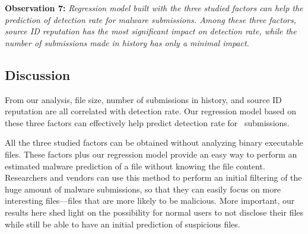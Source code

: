 {\bf Observation 7:} 
{\em Regression model built with the three studied factors can help the prediction of detection rate for malware submissions. 
Among these three factors, source ID reputation has the most significant impact on detection rate, while the number of submissions 
made in history has only a minimal impact.}


\subsection{Discussion}

From our analysis, file size, number of submissions in history, 
and source ID reputation are all correlated with detection rate.
Our regression model based on these three factors can effectively help predict detection rate for \vt\ submissions. 

All the three studied factors can be obtained without analyzing binary executable files.
These factors plus our regression model provide an easy way to
perform an estimated malware prediction of a file without knowing the file content.  
Researchers and vendors can use this method to perform an initial filtering of the huge amount of malware submissions, 
so that they can easily focus on more interesting files---files that are more likely to be malicious.
More important, our results here shed light on the possibility 
for normal users to not disclose their files while still 
be able to have an initial prediction of suspicious files.

